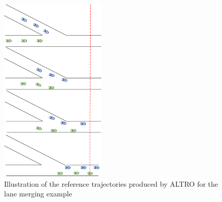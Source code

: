 %


\begin{figure}
	\caption{Illustration of the reference trajectories produced by ALTRO for the lane merging example}
	\label{fig:merge}
	\centering
	\includegraphics[width=0.45\textwidth,height=0.5\textheight]{figures/merge2.png}

\end{figure}




